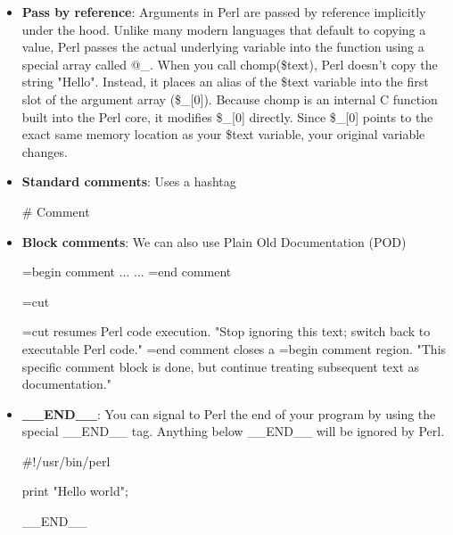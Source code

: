 \documentclass{report}
\begin{document}
\begin{itemize}
\begin{itemize}
            \end{itemize}
        \item \textbf{Pass by reference}: Arguments in Perl are passed by reference implicitly under the hood. Unlike many modern languages that default to copying a value, Perl passes the actual underlying variable into the function using a special array called @\_.
            \bigbreak \noindent 
            When you call chomp(\$text), Perl doesn't copy the string "Hello\string\n". Instead, it places an alias of the \$text variable into the first slot of the argument array (\$\_[0]).
            \bigbreak \noindent 
            Because chomp is an internal C function built into the Perl core, it modifies \$\_[0] directly. Since \$\_[0] points to the exact same memory location as your \$text variable, your original variable changes.



    \end{itemize}

    \pagebreak 
    \begin{itemize}
        \item \textbf{Standard comments}: Uses a hashtag
            \bigbreak \noindent 
            \begin{perlcode}
                # Comment
            \end{perlcode}
        \item \textbf{Block comments}: We can also use Plain Old Documentation (POD)
            \bigbreak \noindent 
            \begin{perlcode}
                =begin comment
                ...
                ...
                =end comment

                =cut
            \end{perlcode}
            \bigbreak \noindent 
            =cut resumes Perl code execution. "Stop ignoring this text; switch back to executable Perl code."
            \bigbreak \noindent 
            =end comment closes a =begin comment region. "This specific comment block is done, but continue treating subsequent text as documentation."
        \item \textbf{\_\_END\_\_}: You can signal to Perl the end of your program by using the special \_\_END\_\_ tag. Anything below \_\_END\_\_ will be ignored by Perl.
            \bigbreak \noindent 
            \begin{perlcode}
                #!/usr/bin/perl

                print "Hello world";

                __END__
            \end{perlcode}

    \end{itemize}
\end{document}

